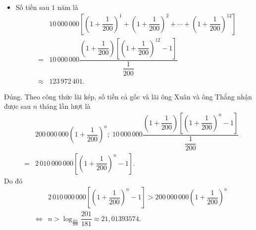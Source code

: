 \begin{ex}
{\begin{itemchoice}
\begin{itemize}
     \item Số tiền sau $1$ năm là
    \begin{eqnarray*}
     & &10\,000\,000\left[\left(1+\dfrac{1}{200}  \right)^1+\left(1+\dfrac{1}{200} \right)^2+\cdots+\left(1+\dfrac{1}{200} \right)^{12} \right]\\
     &=&10\,000\,000\dfrac{\left(1+\dfrac{1}{200} \right)\left[\left(1+\dfrac{1}{200}  \right)^{12}-1\right]}{\dfrac{1}{200}}\\
      &\approx& 123\,972\,401.
    \end{eqnarray*}
   \end{itemize}
   \itemch Đúng. Theo  công thức lãi kép, số tiền cả gốc và lãi ông Xuân và ông Thắng nhận được sau $n$ tháng lần lượt là
   \begin{eqnarray*}
    & &200\,000\,000\left(1+\dfrac{1}{200} \right)^n;\; 10\,000\,000\dfrac{\left(1+\dfrac{1}{200} \right)\left[\left(1+\dfrac{1}{200} \right)^n-1\right]}{\dfrac{1}{200}}\\ 
    &=&2\,010\,000\,000\left[\left(1+\dfrac{1}{200}  \right)^n-1\right].
   \end{eqnarray*}
   \[ 
   \] 
   Do  đó
   \begin{eqnarray*}
     & &2\,010\,000\,000\left[\left(1+\dfrac{1}{200} \right)^n-1\right] > 200\,000\,000\left(1+\dfrac{1}{200} \right)^n\\
    &\Leftrightarrow& n > \log _{\frac{201}{200}} \dfrac{201}{181} \approx 21{,}01393574. 
   \end{eqnarray*}
  \end{itemchoice}
  }
\end{ex}

